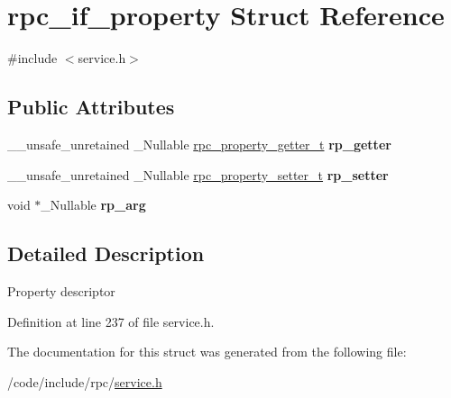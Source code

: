 \hypertarget{structrpc__if__property}{}\section{rpc\+\_\+if\+\_\+property Struct Reference}
\label{structrpc__if__property}


{\ttfamily \#include $<$service.\+h$>$}

\subsection*{Public Attributes}
\begin{DoxyCompactItemize}
\item 
\mbox{\label{structrpc__if__property_ae19b459a98e396cb5f6f8e4938d6c018}} 
\+\_\+\+\_\+unsafe\+\_\+unretained \+\_\+\+Nullable \hyperlink{service_8h_ab438f0c33f3f3876f1c9a23d62134f16}{rpc\+\_\+property\+\_\+getter\+\_\+t} {\bfseries rp\+\_\+getter}
\item 
\mbox{\label{structrpc__if__property_a45fe384e6ad2355ba81781fe16b9d421}} 
\+\_\+\+\_\+unsafe\+\_\+unretained \+\_\+\+Nullable \hyperlink{service_8h_aa8b38d8ab3bafe79a96edaebafe13b8d}{rpc\+\_\+property\+\_\+setter\+\_\+t} {\bfseries rp\+\_\+setter}
\item 
\mbox{\label{structrpc__if__property_a81d2953a7a4bdff1775330c29992546b}} 
void $\ast$\+\_\+\+Nullable {\bfseries rp\+\_\+arg}
\end{DoxyCompactItemize}


\subsection{Detailed Description}
Property descriptor 

Definition at line 237 of file service.\+h.



The documentation for this struct was generated from the following file\+:\begin{DoxyCompactItemize}
\item 
/code/include/rpc/\hyperlink{service_8h}{service.\+h}\end{DoxyCompactItemize}
